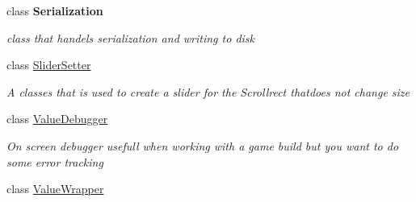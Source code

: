 \begin{DoxyCompactItemize}
class {\bfseries Serialization}
\begin{DoxyCompactList}\small\item\em class that handels serialization and writing to disk \end{DoxyCompactList}\item 
class \hyperlink{class_util_1_1_slider_setter}{Slider\+Setter}
\begin{DoxyCompactList}\small\item\em A classes that is used to create a slider for the Scrollrect thatdoes not change size \end{DoxyCompactList}\item 
class \hyperlink{class_util_1_1_value_debugger}{Value\+Debugger}
\begin{DoxyCompactList}\small\item\em On screen debugger usefull when working with a game build but you want to do some error tracking \end{DoxyCompactList}\item 
class \hyperlink{class_util_1_1_value_wrapper}{Value\+Wrapper}
\end{DoxyCompactItemize}
